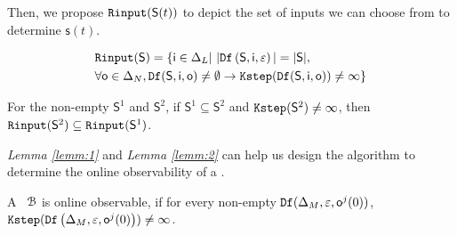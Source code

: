 Then, we propose ${\tt Rinput}(\mathsf{S}(t))$ to depict the set of inputs we can choose from to determine $\mathsf{s}(t)$.

\begin{definition}[$\Ri(\mathsf{S})$] 
\begin{equation*}
\begin{split}
&{\tt Rinput}(\mathsf{S})=\{\mathsf{i}\in \Delta_L|\  |{\tt Df}\left(\mathsf{S},\mathsf{i},\varepsilon\right)|=|\mathsf{S}|, \\
& \forall \mathsf{o} \in \Delta_N, {\tt Df}(\mathsf{S},\mathsf{i},\mathsf{o})\ne \emptyset \rightarrow {\tt Kstep}({\tt Df}(\mathsf{S},\mathsf{i},\mathsf{o}))\ne \infty\}
\end{split}
\end{equation*}
\end{definition}
\begin{lemma}
For the non-empty $\mathsf{S}^{1}$ and $\mathsf{S}^{2}$, if $\mathsf{S}^{1}\subseteq\mathsf{S}^{2}$ and ${\tt Kstep}(\mathsf{S}^{2})\ne\infty$, then ${\tt Rinput}(\mathsf{S}^2)\subseteq{\tt Rinput}(\mathsf{S}^1)$.
\label{lemm:2}
\end{lemma}

{\em Lemma \ref{lemm:1}} and {\em Lemma \ref{lemm:2}} can help us design the algorithm to determine the online observability of a \BCN.%


\begin{definition}
 A \BCN\ ${\mathcal{B}}$ is online observable,
if for every non-empty ${\tt Df}(\Delta_M,\varepsilon, \mathsf{o}^{j}(0))$, ${\tt Kstep}({\tt Df}\left(\Delta_M,\varepsilon,\mathsf{o}^{j}(0)\right))\ne\infty$.
\end{definition}


